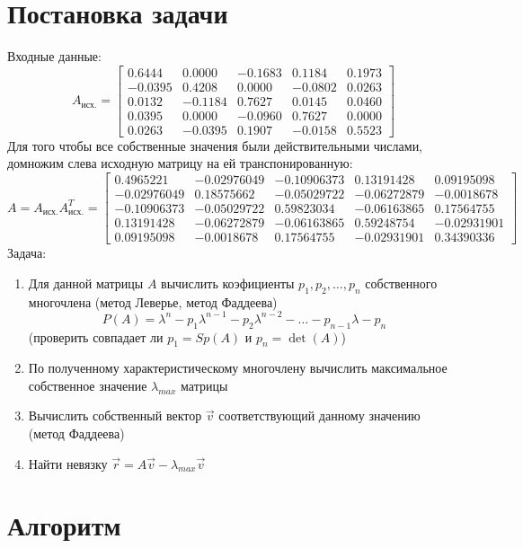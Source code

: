 \documentclass[11.4pt]{article}
\begin{document}
\section{Постановка задачи}
	Входные данные:
	\[ A_{\text{исх.}}=
		\left[
			\begin{array}{ccccc}
				0.6444 & 0.0000 & -0.1683 & 0.1184 & 0.1973\\
				-0.0395 & 0.4208 & 0.0000 & -0.0802 & 0.0263\\
				0.0132  & -0.1184 & 0.7627 & 0.0145 & 0.0460\\
				0.0395 & 0.0000 & -0.0960 & 0.7627 & 0.0000\\
				0.0263 & -0.0395 & 0.1907 & -0.0158 & 0.5523
			\end{array}
		\right]
	\]
	Для того чтобы все собственные значения были действительными числами, домножим слева исходную матрицу на ей транспонированную:
	\[ A=A_{\text{исх.}}A_{\text{исх.}}^T=
		\left[
			\begin{array}{ccccc}
				 0.4965221 & -0.02976049 & -0.10906373 &  0.13191428 & 0.09195098\\
 				-0.02976049 & 0.18575662 & -0.05029722 & -0.06272879 & -0.0018678\\
 				-0.10906373 & -0.05029722 & 0.59823034 & -0.06163865 &  0.17564755\\
 				 0.13191428 & -0.06272879 & -0.06163865 &  0.59248754 & -0.02931901\\
 				 0.09195098 & -0.0018678  & 0.17564755 & -0.02931901 &  0.34390336
			\end{array}
		\right]
	\]
	Задача:
	\begin{enumerate}
		\item Для данной матрицы $A$ вычислить коэфициенты $p_1,p_2,\ldots,p_n$ собственного многочлена (метод Леверье, метод Фаддеева) \[P(A)=\lambda^n - p_1\lambda^{n-1} - p_2\lambda^{n-2}-\ldots-p_{n-1}\lambda - p_n\]
		\subitem (проверить совпадает ли $p_1=Sp(A)$ и $p_n = \det(A)$)
		\item По  полученному характеристическому многочлену вычислить максимальное собственное значение $\lambda_{max}$ матрицы
		\item Вычислить собственный вектор $\vec{v}$ соответствующий данному значению (метод Фаддеева)
		\item Найти невязку $\vec{r} = A\vec{v} - \lambda_{max}\vec{v} $
	\end{enumerate}
\section{Алгоритм}
\end{document}
